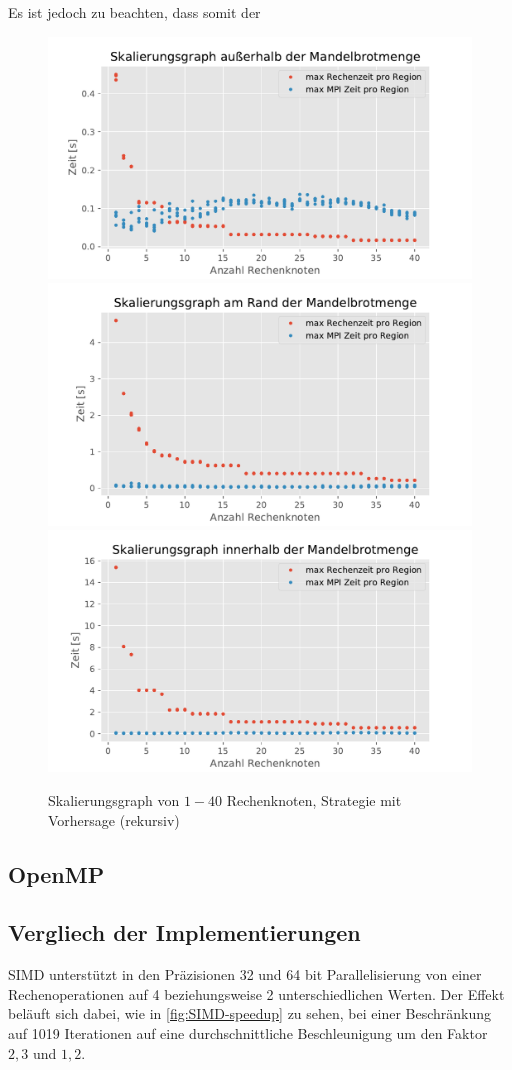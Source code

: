 Es ist jedoch zu beachten, dass somit der 
\begin{figure}
	\centering
	\includegraphics[width=0.32\linewidth]{img/Evaluation/scaling/scale_graph_outside}
	\includegraphics[width=0.32\linewidth]{img/Evaluation/scaling/scale_graph_border}
	\includegraphics[width=0.32\linewidth]{img/Evaluation/scaling/scale_graph_inside}
	\caption{Skalierungsgraph von \( 1-40 \) Rechenknoten, Strategie mit Vorhersage (rekursiv)}
	\label{fig:scaleGraph}
\end{figure}

\subsection{OpenMP}


\subsection{Vergliech der Implementierungen}




SIMD unterstützt in den Präzisionen 32 und 64 bit Parallelisierung von einer Rechenoperationen auf
4 beziehungsweise 2 unterschiedlichen Werten. Der Effekt beläuft sich dabei, wie in \autoref{fig:SIMD-speedup} zu sehen,
bei einer Beschränkung auf 1019 Iterationen auf eine durchschnittliche Beschleunigung um den Faktor $2,3$ und $1,2$.


